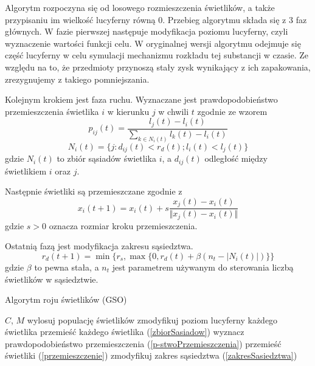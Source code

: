 \documentclass[11pt,a4paper,twoside]{article}
\begin{document}
Algorytm rozpoczyna się od losowego rozmieszczenia świetlików, a także przypisaniu im wielkość lucyferny równą 0. Przebieg algorytmu składa się z 3 faz głównych. W fazie pierwszej następuje modyfikacja poziomu lucyferny, czyli wyznaczenie wartości funkcji celu. W oryginalnej wersji algorytmu odejmuje się część lucyferny w celu symulacji mechanizmu rozkładu tej substancji w czasie. Ze względu na to, że przedmioty przynoszą stały zysk wynikający z ich zapakowania, zrezygnujemy z takiego pomniejszania.

Kolejnym krokiem jest faza ruchu. Wyznaczane jest prawdopodobieństwo przemieszczenia świetlika $i$ w kierunku $j$ w chwili $t$ zgodnie ze wzorem
\begin{equation}
p_{ij}(t) = \frac{l_{j}(t)-l_{i}(t)}{\sum_{k\in N_{i}(t)} l_{k}(t) - l_{i}(t)}
\label{p-stwoPrzemieszczenia}
\end{equation}
\begin{equation}
N_{i}(t) = \{j: d_{ij}(t) < r_{d}(t) ; l_{i}(t) < l_{j}(t)\}
\label{zbiorSasiadow}
\end{equation}
gdzie $N_{i}(t)$ to zbiór sąsiadów świetlika $i$, a $d_{ij}(t)$ odległość między świetlikiem $i$ oraz $j$.

Następnie świetliki są przemieszczane zgodnie z 
\begin{equation}
x_{i}(t+1) = x_{i}(t) + s\frac{x_{j}(t) - x_{i}(t)}{\Vert x_{j}(t) - x_{i}(t) \Vert}
\label{przemieszczenie}
\end{equation}
gdzie $s > 0$ oznacza rozmiar kroku przemieszczenia.

Ostatnią fazą jest modyfikacja zakresu sąsiedztwa.
\begin{equation}
r_{d}(t+1) = \min \bigg\{ r_{s}, \max \big\{0, r_{d}(t)+\beta(n_{t} - |N_{i}(t)|) \big\} \bigg\}
\label{zakresSasiedztwa}
\end{equation}
gdzie $\beta$ to pewna stała, a $n_{t}$ jest parametrem używanym do sterowania liczbą świetlików w sąsiedztwie.

\begin{algorithm}[ht]
\caption{Algorytm roju świetlików (GSO)}
\label{GSO}
\begin{algorithmic}%
\Require $C$, $M$
	\State wylosuj populację świetlików
	\State zmodyfikuj poziom lucyferny każdego świetlika
	\State przemieść każdego świetlika (\ref{zbiorSasiadow})
		\State wyznacz prawdopodobieństwo przemieszczenia (\ref{p-stwoPrzemieszczenia})
		\State przemieść świetliki (\ref{przemieszczenie})
		\State zmodyfikuj zakres sąsiedztwa (\ref{zakresSasiedztwa})
	\EndFor	
	\EndWhile	
\end{algorithmic}
\end{algorithm}
\end{document}
